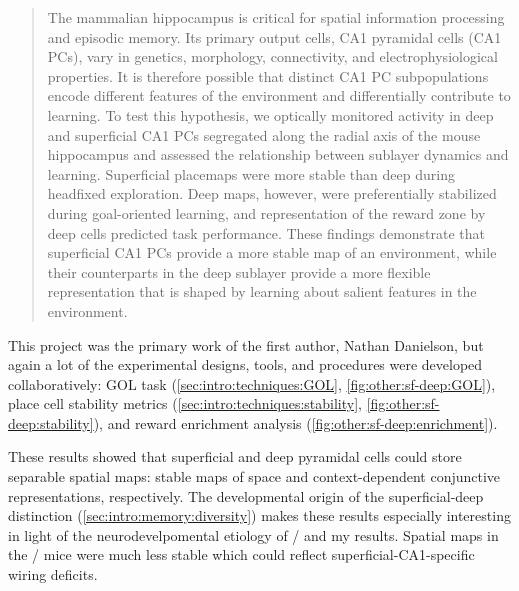 \begin{quote}
The mammalian hippocampus is critical for spatial information processing and episodic memory. Its primary output cells, CA1 pyramidal cells (CA1 PCs), vary in genetics, morphology, connectivity, and electrophysiological properties. It is therefore possible that distinct CA1 PC subpopulations encode different features of the environment and differentially contribute to learning. To test this hypothesis, we optically monitored activity in deep and superficial CA1 PCs segregated along the radial axis of the mouse hippocampus and assessed the relationship between sublayer dynamics and learning. Superficial placemaps were more stable than deep during headfixed exploration. Deep maps, however, were preferentially stabilized during goal-oriented learning, and representation of the reward zone by deep cells predicted task performance. These findings demonstrate that superficial CA1 PCs provide a more stable map of an environment, while their counterparts in the deep sublayer provide a more flexible representation that is shaped by learning about salient features in the environment.
\end{quote}

This project was the primary work of the first author, Nathan Danielson, but again a lot of the experimental designs, tools, and procedures were developed collaboratively: \ac{GOL} task (\autoref{sec:intro:techniques:GOL}, \autoref{fig:other:sf-deep:GOL}), place cell stability metrics (\autoref{sec:intro:techniques:stability}, \autoref{fig:other:sf-deep:stability}), and reward enrichment analysis (\autoref{fig:other:sf-deep:enrichment}).

These results showed that superficial and deep pyramidal cells could store separable spatial maps: stable maps of space and context-dependent conjunctive representations, respectively.
The developmental origin of the superficial-deep distinction (\autoref{sec:intro:memory:diversity}) makes these results especially interesting in light of the neurodevelpomental etiology of \scz/ and my results.
Spatial maps in the \df/ mice were much less stable which could reflect superficial-CA1-specific wiring deficits.

